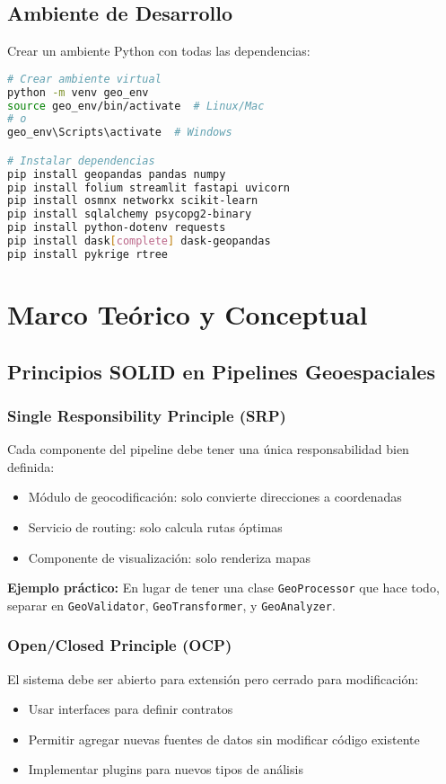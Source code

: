 \documentclass[11pt,a4paper]{article}
\begin{document}
\subsection{Ambiente de Desarrollo}
Crear un ambiente Python con todas las dependencias:

\begin{lstlisting}[language=bash]
# Crear ambiente virtual
python -m venv geo_env
source geo_env/bin/activate  # Linux/Mac
# o
geo_env\Scripts\activate  # Windows

# Instalar dependencias
pip install geopandas pandas numpy
pip install folium streamlit fastapi uvicorn
pip install osmnx networkx scikit-learn
pip install sqlalchemy psycopg2-binary
pip install python-dotenv requests
pip install dask[complete] dask-geopandas
pip install pykrige rtree
\end{lstlisting}

\section{Marco Teórico y Conceptual}

\subsection{Principios SOLID en Pipelines Geoespaciales}

\subsubsection{Single Responsibility Principle (SRP)}
Cada componente del pipeline debe tener una única responsabilidad bien definida:
\begin{itemize}
    \item Módulo de geocodificación: solo convierte direcciones a coordenadas
    \item Servicio de routing: solo calcula rutas óptimas
    \item Componente de visualización: solo renderiza mapas
\end{itemize}

\textbf{Ejemplo práctico:} En lugar de tener una clase \texttt{GeoProcessor} que hace todo, separar en \texttt{GeoValidator}, \texttt{GeoTransformer}, y \texttt{GeoAnalyzer}.

\subsubsection{Open/Closed Principle (OCP)}
El sistema debe ser abierto para extensión pero cerrado para modificación:
\begin{itemize}
    \item Usar interfaces para definir contratos
    \item Permitir agregar nuevas fuentes de datos sin modificar código existente
    \item Implementar plugins para nuevos tipos de análisis
\end{itemize}
\end{document}
